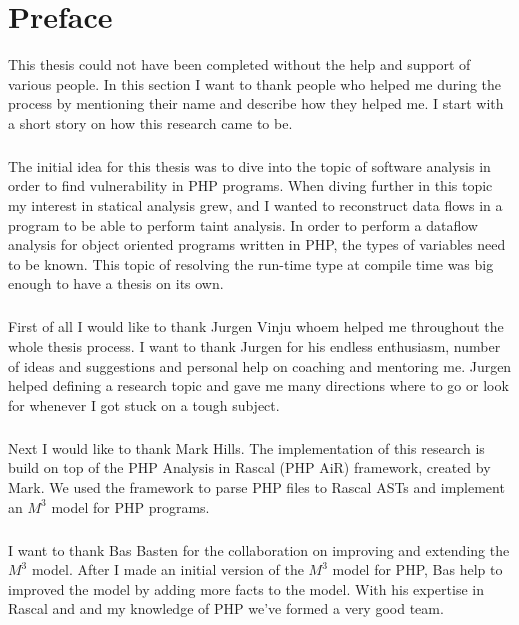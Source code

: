 \documentclass[../main.tex]{subfiles}
\begin{document}
    \chapter*{Preface}\label{ch:preface}
    
    This thesis could not have been completed without the help and support of various people. 
    In this section I want to thank people who helped me during the process by mentioning their name and describe how they helped me. 
    I start with a short story on how this research came to be.
    
    \paragraph{}
    The initial idea for this thesis was to dive into the topic of software analysis in order to find vulnerability in PHP programs.
    When diving further in this topic my interest in statical analysis grew, and I wanted to reconstruct data flows in a program to be able to perform taint analysis.
    In order to perform a dataflow analysis for object oriented programs written in PHP, the types of variables need to be known.
    This topic of resolving the run-time type at compile time was big enough to have a thesis on its own.
    
    \paragraph{}
    First of all I would like to thank Jurgen Vinju whoem helped me throughout the whole thesis process.
    I want to thank Jurgen for his endless enthusiasm, number of ideas and suggestions and personal help on coaching and mentoring me.
    Jurgen helped defining a research topic and gave me many directions where to go or look for whenever I got stuck on a tough subject.
    
    \paragraph{}
    Next I would like to thank Mark Hills.
    The implementation of this research is build on top of the PHP Analysis in Rascal (PHP AiR) framework, created by Mark.
    We used the framework to parse PHP files to Rascal ASTs and implement an $M^3$ model for PHP programs.
    
    \paragraph{}
    I want to thank Bas Basten for the collaboration on improving and extending the $M^3$ model.
    After I made an initial version of the $M^3$ model for PHP, Bas help to improved the model by adding more facts to the model.
    With his expertise in Rascal and and my knowledge of PHP we've formed a very good team.
    
\end{document}
